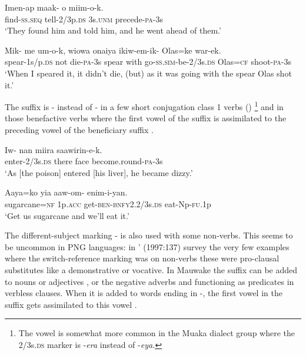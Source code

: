 \ea%
\label{ex:3:x244}
\gll Imen-ap maak- o miim-o-k. \\
find-\textsc{ss}.\textsc{seq} tell-2/3p.\textsc{ds} 3s.\textsc{unm} precede-\textsc{pa}-3s \\
\glt`They found him and told him, and he went ahead of them.' 
\z

\ea%
\label{ex:3:x245}
\gll Mik- me um-o-k, wiowa onaiya ikiw-em-ik- Olas=ke war-ek.\\
spear-1s/p.\textsc{ds} not die-\textsc{pa}-3s spear with go-\textsc{ss}.\textsc{sim}-be-2/3s.\textsc{ds} Olas=\textsc{cf} shoot-\textsc{pa}-3s\\
\glt`When I speared it, it didn't die, (but) as it was going with the spear Olas shot it.'
\z

The suffix is - instead of \nobreakdash- in a few short conjugation class 1 verbs () \footnote{The vowel  is somewhat more common in the Muaka dialect group where the 2/3s.\textsc{ds} marker is -\textit{era} instead of \nobreakdash-\textit{eya.}} and in those benefactive verbs where the first vowel of the suffix is assimilated to the preceding vowel of the beneficiary suffix . 

\ea%
\label{ex:3:x493}
\gll Iw- nan miira saawirin-e-k. \\
enter-2/3s.\textsc{ds} there face become.round-\textsc{pa}-3s\\
\glt`As [the poison] entered [his liver], he became dizzy.'
\z

\ea%
\label{ex:3:x695}
\gll Aaya=ko yia aaw-om- enim-i-yan. \\
sugarcane=\textsc{nf} 1p.\textsc{acc} get-\textsc{ben}-\textsc{bnfy}2.2/3s.\textsc{ds} eat-Np-\textsc{fu}.1p\\
\glt`Get us sugarcane and we'll eat it.'
\z

The different-subject marking \nobreakdash- is also used with some non-verbs. This seems to be uncommon in PNG languages: in \citeauthor{Roberts1997}' (1997:137) survey the very few examples where the switch-reference marking was on non-verbs these were pro-clausal substitutes like a demonstrative or vocative. In Mauwake the  suffix can be added to nouns  or adjectives , or the negative adverbs  and   functioning as predicates in verbless clauses. When it is added to words ending in -, the first vowel in the suffix gets assimilated to this vowel .

